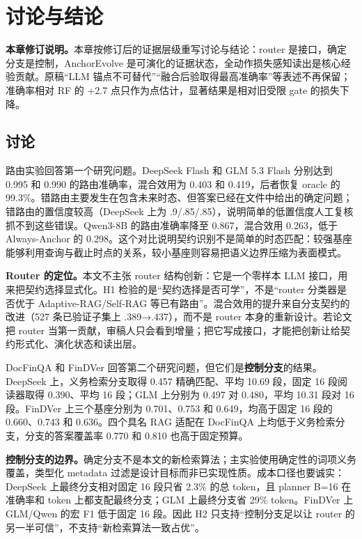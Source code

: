 \chapter{讨论与结论}
\label{ch:conclusion}

\begin{revbox}
\noindent\textbf{本章修订说明。}本章按修订后的证据层级重写讨论与结论：router 是接口，确定分支是控制，AnchorEvolve 是可演化的证据状态，全动作损失感知读出是核心经验贡献。原稿“LLM 锚点不可替代”“融合后验取得最高准确率”等表述不再保留；准确率相对 RF 的 +2.7 点只作为点估计，显著结果是相对旧受限 gate 的损失下降。
\end{revbox}

\section{讨论}

路由实验回答第一个研究问题。DeepSeek Flash 和 GLM 5.3 Flash 分别达到 0.995 和 0.990 的路由准确率，混合效用为 0.403 和 0.419，后者恢复 oracle 的 99.3\%。错路由主要发生在包含未来时态、但答案已经在文件中给出的确定问题；错路由的置信度较高（DeepSeek 上为 .9/.85/.85），说明简单的低置信度人工复核抓不到这些错误。Qwen3-8B 的路由准确率降至 0.867，混合效用 0.263，低于 Always-Anchor 的 0.298。这个对比说明契约识别不是简单的时态匹配：较强基座能够利用查询与截止时点的关系，较小基座则容易把语义边界压缩为表面模式。

\begin{revbox}
\noindent\textbf{Router 的定位。}本文不主张 router 结构创新：它是一个零样本 LLM 接口，用来把契约选择显式化。H1 检验的是“契约选择是否可学”，不是“router 分类器是否优于 Adaptive-RAG/Self-RAG 等已有路由”。混合效用的提升来自分支契约的改进（527 条已验证子集上 .389→.437），而不是 router 本身的重新设计。若论文把 router 当第一贡献，审稿人只会看到增量；把它写成接口，才能把创新让给契约形式化、演化状态和读出层。
\end{revbox}

DocFinQA 和 FinDVer 回答第二个研究问题，但它们是\textbf{控制分支}的结果。DeepSeek 上，义务检索分支取得 0.457 精确匹配、平均 10.69 段，固定 16 段阅读器取得 0.390、平均 16 段；GLM 上分别为 0.497 对 0.480，平均 10.31 段对 16 段。FinDVer 上三个基座分别为 0.701、0.753 和 0.649，均高于固定 16 段的 0.660、0.743 和 0.636。四个具名 RAG 适配在 DocFinQA 上均低于义务检索分支，分支的答案覆盖率 0.770 和 0.810 也高于固定预算。

\begin{revbox}
\noindent\textbf{控制分支的边界。}确定分支不是本文的新检索算法；主实验使用确定性的词项义务覆盖，类型化 metadata 过滤是设计目标而非已实现性质。成本口径也要诚实：DeepSeek 上最终分支相对固定 16 段只省 2.3\% 的总 token，且 planner B=16 在准确率和 token 上都支配最终分支；GLM 上最终分支省 29\% token。FinDVer 上 GLM/Qwen 的宏 F1 低于固定 16 段。因此 H2 只支持“控制分支足以让 router 的另一半可信”，不支持“新检索算法一致占优”。
\end{revbox}

